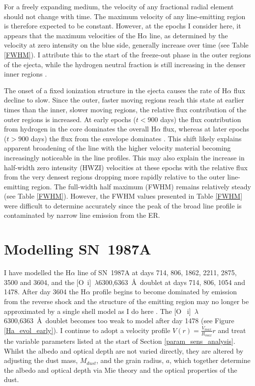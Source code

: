 For a freely expanding medium, the velocity of any fractional radial 
element should not change with time.  The maximum velocity of any 
line-emitting region is therefore expected to be constant.  However, at 
the epochs I consider here, it appears that the maximum velocities of the 
H$\alpha$ line, as determined by the velocity at zero intensity on the 
blue side, generally increase over time (see Table \ref{FWHM}).  I 
attribute this to the start of the freeze-out phase in the outer regions 
of the ejecta, while the hydrogen neutral fraction is still increasing in 
the denser inner regions \citep{Danziger1991,Fransson1993}.

The onset of a fixed ionization structure in the ejecta causes the rate of 
H$\alpha$ flux decline to slow.  Since the outer, faster moving regions 
reach this state at earlier times than the inner, slower moving regions, 
the relative flux contribution of the outer regions is increased.  At 
early epochs ($t<900$ days) the flux contribution from hydrogen in the 
core dominates the overall H$\alpha$ flux, whereas at later epochs ($t > 
900$ days) the flux from the envelope dominates \citep{Fransson1993, 
Kozma1998a}.  This shift likely explains apparent broadening of the line 
with the higher velocity material becoming increasingly noticeable in the 
line profiles.  This may also explain the increase in half-width zero intensity (HWZI) velocities at 
these epochs with the relative flux from the very densest regions dropping 
more rapidly relative to the outer line-emitting region. The full-width 
half maximum (FWHM) remains relatively steady (see Table 
\ref{FWHM}). However, the FWHM values presented in Table \ref{FWHM} were difficult 
to determine accurately since the peak of the broad line profile is 
contaminated by narrow line emission from the ER.


\section{Modelling SN~1987A}
\label{results}





I have modelled the H$\alpha$ line of SN~1987A at days 714, 806, 1862, 
2211, 2875, 3500 and 3604, and the [O~{\sc i}]~$\lambda$6300,6363~\AA\ 
doublet at days 714, 806, 1054 and 1478.  After day 3604 the H$\alpha$ 
profile begins to become dominated by emission from the reverse shock and 
the structure of the emitting region may no longer be approximated by a 
single shell model as I do here \citep{Fransson2013}.  The [O~{\sc 
i}]~$\lambda$6300,6363~\AA\ doublet becomes too weak to model after day 
1478 (see Figure \ref{Ha_evol_early}).  I continue to adopt a velocity 
profile $V(r) = \frac{V_{max}}{R_{max}}r$ and treat the variable 
parameters listed at the start of Section \ref{param_sens_analysis}.  Whilst the albedo and 
optical depth are not varied directly, they are altered by adjusting the 
dust mass, $M_{dust}$, and the grain radius, $a$, which together determine 
the albedo and optical depth via Mie theory and the optical properties of 
the dust.

